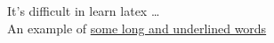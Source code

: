 \documentclass{article}
\begin{document}
	It's difficult in learn latex \ldots \\
	An example of  \uline{some long and underlined words}
\end{document}
